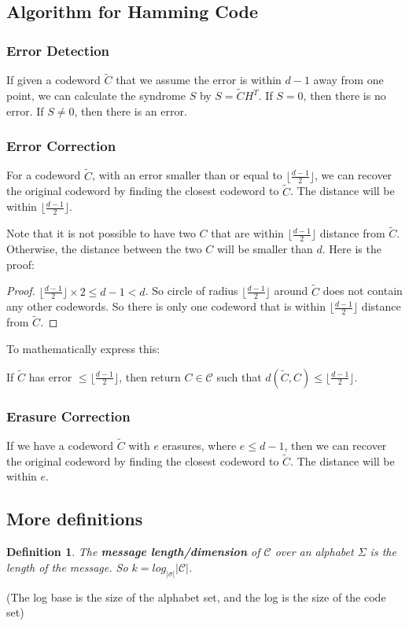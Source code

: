 \documentclass[letterpaper,12pt]{article}
\newtheorem{definition}{Definition}
\begin{document}
\subsection{Algorithm for Hamming Code}
\subsubsection{Error Detection}
If given a codeword $\tilde{C}$ that we assume the error is within $d-1$ away
from one point, we can calculate the syndrome $S$ by $S = \tilde{C}H^T$. If
$S=0$, then there is no error. If $S\neq 0$, then there is an error.

\subsubsection{Error Correction}
For a codeword $\tilde{C}$, with an error smaller than or equal to $\lfloor
    \frac{d-1}{2}\rfloor$, we can recover the original codeword by finding the
closest codeword to $\tilde{C}$. The distance will be within $\lfloor
    \frac{d-1}{2}\rfloor$.

Note that it is not possible to have two $C$ that are within $\lfloor
    \frac{d-1}{2}\rfloor$ distance from $\tilde{C}$. Otherwise, the distance
between the two $C$ will be smaller than $d$. Here is the proof:
\begin{proof}

    $\lfloor \frac{d-1}{2}\rfloor\times 2\le d-1<d$. So circle of radius $\lfloor \frac{d-1}{2}\rfloor$ around $\tilde{C}$ does not contain any other codewords. So there is only one codeword that is within $\lfloor \frac{d-1}{2}\rfloor$ distance from $\tilde{C}$.
\end{proof}

To mathematically express this:

If $\tilde{C}$ has error $\le \lfloor \frac{d-1}{2}\rfloor$, then return
$C\in\mathcal{C}$ such that $d(\tilde{C},C)\le \lfloor \frac{d-1}{2}\rfloor$.

\subsubsection{Erasure Correction}
If we have a codeword $\tilde{C}$ with $e$ erasures, where $e\le d-1$, then we
can recover the original codeword by finding the closest codeword to
$\tilde{C}$. The distance will be within $e$.

\subsection{More definitions}
\begin{definition}
    The \textbf{message length/dimension} of $\mathcal{C}$ over an alphabet $\Sigma$ is the length of the message. So $k=log_{|\sigma|}{|\mathcal{C}|}$.
\end{definition}
(The log base is the size of the alphabet set, and the log is the size of the code set)
\end{document}
